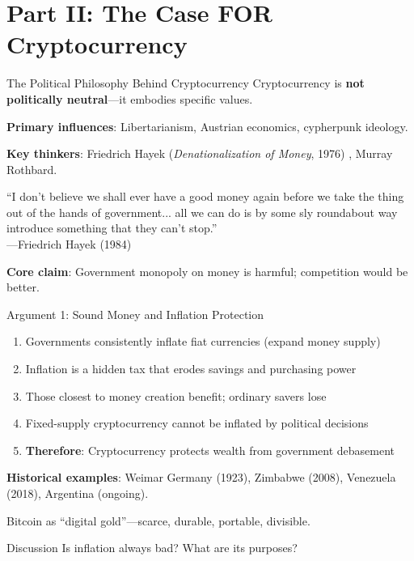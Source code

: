﻿\documentclass[aspectratio=169,11pt]{beamer}
\begin{document}
\section{Part II: The Case FOR Cryptocurrency}

\begin{frame}{The Political Philosophy Behind Cryptocurrency}
Cryptocurrency is \textbf{not politically neutral}---it embodies specific values.

\vspace{0.3em}
\textbf{Primary influences}: Libertarianism, Austrian economics, cypherpunk ideology.

\textbf{Key thinkers}: Friedrich Hayek (\emph{Denationalization of Money}, 1976) \parencite{hayek_denationalization}, Murray Rothbard.

\begin{quotebox}
``I don't believe we shall ever have a good money again before we take the thing out of the hands of government... all we can do is by some sly roundabout way introduce something that they can't stop.''\\
\hfill---Friedrich Hayek (1984)
\end{quotebox}

\textbf{Core claim}: Government monopoly on money is harmful; competition would be better.
\end{frame}

\begin{frame}{Argument 1: Sound Money and Inflation Protection}
\begin{probox}
\begin{enumerate}
    \item Governments consistently inflate fiat currencies (expand money supply)
    \item Inflation is a hidden tax that erodes savings and purchasing power
    \item Those closest to money creation benefit; ordinary savers lose
    \item Fixed-supply cryptocurrency cannot be inflated by political decisions
    \item \textbf{Therefore}: Cryptocurrency protects wealth from government debasement
\end{enumerate}
\end{probox}

\vspace{0.3em}
\textbf{Historical examples}: Weimar Germany (1923), Zimbabwe (2008), Venezuela (2018), Argentina (ongoing).

Bitcoin as ``digital gold''---scarce, durable, portable, divisible.

\begin{alertblock}{Discussion}
Is inflation always bad? What are its purposes?
\end{alertblock}
\end{frame}
\end{document}
